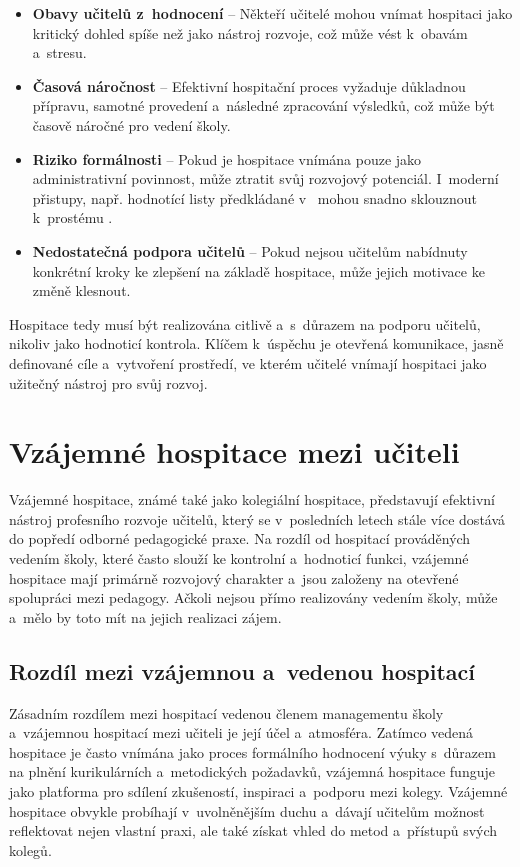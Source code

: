 \begin{itemize}
    \item \textbf{Obavy učitelů z~hodnocení} – Někteří učitelé mohou vnímat hospitaci jako kritický dohled spíše než jako nástroj rozvoje, což může vést k~obavám a~stresu.
    \item \textbf{Časová náročnost} – Efektivní hospitační proces vyžaduje důkladnou přípravu, samotné provedení a~následné zpracování výsledků, což může být časově náročné pro vedení školy.
    \item \textbf{Riziko formálnosti} – Pokud je hospitace vnímána pouze jako administrativní povinnost, může ztratit svůj rozvojový potenciál. I~moderní přistupy, např. hodnotící listy předkládané v~\cite{hospitace-prostredek} mohou snadno sklouznout k~prostému .
    \item \textbf{Nedostatečná podpora učitelů} – Pokud nejsou učitelům nabídnuty konkrétní kroky ke zlepšení na základě hospitace, může jejich motivace ke změně klesnout.
\end{itemize}

Hospitace tedy musí být realizována citlivě a~s~důrazem na podporu učitelů, nikoliv jako hodnoticí kontrola. Klíčem k~úspěchu je otevřená komunikace, jasně definované cíle a~vytvoření prostředí, ve kterém učitelé vnímají hospitaci jako užitečný nástroj pro svůj rozvoj.

\section{Vzájemné hospitace mezi učiteli}
Vzájemné hospitace, známé také jako kolegiální hospitace, představují efektivní nástroj profesního rozvoje učitelů, který se v~posledních letech stále více dostává do popředí odborné pedagogické praxe. Na rozdíl od hospitací prováděných vedením školy, které často slouží ke kontrolní a~hodnoticí funkci, vzájemné hospitace mají primárně rozvojový charakter a~jsou založeny na otevřené spolupráci mezi pedagogy. Ačkoli nejsou přímo realizovány vedením školy, může a~mělo by toto mít na jejich realizaci zájem.

\subsection{Rozdíl mezi vzájemnou a~vedenou hospitací}
Zásadním rozdílem mezi hospitací vedenou členem managementu školy a~vzájemnou hospitací mezi učiteli je její účel a~atmosféra. Zatímco vedená hospitace je často vnímána jako proces formálního hodnocení výuky s~důrazem na plnění kurikulárních a~metodických požadavků, vzájemná hospitace funguje jako platforma pro sdílení zkušeností, inspiraci a~podporu mezi kolegy. Vzájemné hospitace obvykle probíhají v~uvolněnějším duchu a~dávají učitelům možnost reflektovat nejen vlastní praxi, ale také získat vhled do metod a~přístupů svých kolegů.

